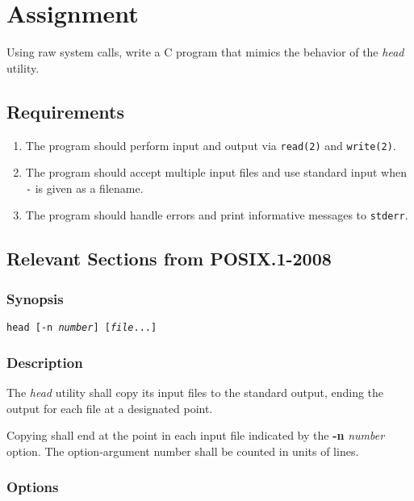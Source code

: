 \documentclass[en, listings]{labreport}
\begin{document}
\maketitlepage

\section*{Assignment}

Using raw system calls, write a C program that mimics the behavior of the \textit{head} utility.

\subsection*{Requirements}

\begin{enumerate}
\item The program should perform input and output via \verb|read(2)| and \verb|write(2)|.
\item The program should accept multiple input files and use standard input when \texttt{-} is given as a filename.
\item The program should handle errors and print informative messages to \verb|stderr|.
\end{enumerate}

\subsection*{Relevant Sections from POSIX.1-2008}

\subsubsection*{Synopsis}

\noindent
\texttt{head [-n \textit{number}] [\textit{file}...]}

\subsubsection*{Description}

\noindent
The \textit{head} utility shall copy its input files to the standard output,
ending the output for each file at a designated point.

\noindent
Copying shall end at the point in each input file indicated by the
\textbf{-n} \textit{number} option. The option-argument number shall be counted in units of lines.

\subsubsection*{Options}
\end{document}
